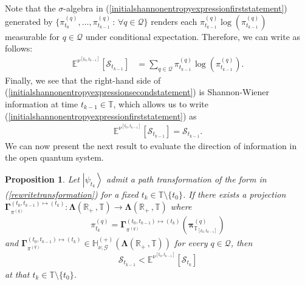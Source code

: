 \documentclass[12pt,a4paper]{article}
\newtheorem{prop}[thm]{Proposition}
\def\R{\mathbb{R}}
\def\T{\mathbb{T}}
\def\G{\mathscr{G}}
\begin{document}
Note that the $\sigma$-algebra in (\ref{initialshannonentropyexpressionfirststatement}) generated by $\{\pi_{t_{0}}^{(q)}, \ldots, \pi_{t_{k-1}}^{(q)} \,: \, \forall q\in\mathcal{Q}\}$ renders each $\pi_{t_{k-1}}^{(q)} \log\left( \pi_{t_{k-1}}^{(q)} \right)$ measurable for $q\in\mathcal{Q}$ under conditional expectation. Therefore, we can write as follows:
\begin{align}
\mathbb{E}^{\nu^{[t_{0},t_{k-1}]}}\left[\mathcal{S}_{t_{k-1}}\right] &=\sum_{q\in\mathcal{Q}} \pi_{t_{k-1}}^{(q)} \log\left( \pi_{t_{k-1}}^{(q)} \right). \label{initialshannonentropyexpressionsecondstatement}
\end{align}
Finally, we see that the right-hand side of (\ref{initialshannonentropyexpressionsecondstatement}) is Shannon-Wiener information at time $t_{k-1}\in\T$, which allows us to write (\ref{initialshannonentropyexpressionfirststatement}) as
\begin{align}
\mathbb{E}^{\nu^{[t_{0},t_{k-1}]}}\left[\mathcal{S}_{t_{k-1}}\right] = \mathcal{S}_{t_{k-1}}. \label{initialshannonentropyexpression}
\end{align}
We can now present the next result to evaluate the direction of information in the open quantum system.
%
\begin{prop}
\label{mainpropositiontwo}
Let $\left|\psi_{t_{k}}\right\rangle$ admit a path transformation of the form in {\rm (\ref{rewritetransformation})} for a fixed $t_k\in\T\setminus\{t_0\}$. If there exists a projection $\boldsymbol{\Gamma}_{\pi^{(q)}}^{(t_0,t_{k-1})\mapsto(t_k)}: \boldsymbol{\Lambda}(\R_+ \,, \T) \rightarrow \boldsymbol{\Lambda}(\R_+ \,, \T)$ where 
\begin{align}
\pi^{(q)}_{t_{k}} = \boldsymbol{\Gamma}_{\pi^{(q)}}^{(t_0,t_{k-1})\mapsto(t_k)}\left(  \boldsymbol{\pi}_{\T_{[t_0,t_{k-1}]}}^{(q)} \right)  \label{projectionforpitwo}
\end{align}
and $\boldsymbol{\Gamma}_{\pi^{(q)}}^{(t_0,t_{k-1})\mapsto(t_k)} \in \mathbb{H}^{(+)}_{\nu,\G}(\boldsymbol{\Lambda}(\R_+ \,, \T))$ for every $q\in\mathcal{Q}$, then
\begin{align}
\mathcal{S}_{t_{k-1}} < \mathbb{E}^{\nu^{[t_{0},t_{k-1}]}}\left[\mathcal{S}_{t_{k}}\right]  \label{shannondecrease}
\end{align}
at that $t_k\in\T\setminus\{t_0\}$.
\end{prop}
\end{document}

